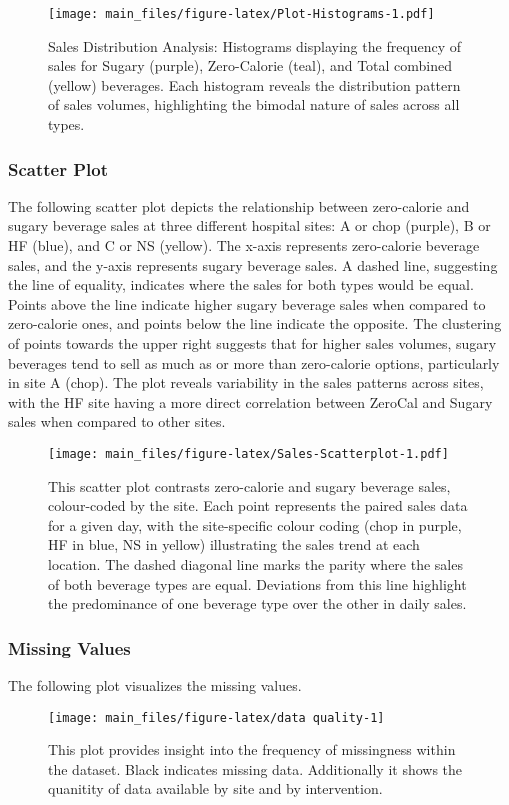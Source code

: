 \documentclass[
]{article}
\begin{document}
\begin{figure}
\centering
\texttt{[image: main\_files/figure-latex/Plot-Histograms-1.pdf]}
\caption{Sales Distribution Analysis: Histograms displaying the
frequency of sales for Sugary (purple), Zero-Calorie (teal), and Total
combined (yellow) beverages. Each histogram reveals the distribution
pattern of sales volumes, highlighting the bimodal nature of sales
across all types.}
\end{figure}

\hypertarget{scatter-plot}{%
\subsubsection{Scatter Plot}\label{scatter-plot}}

The following scatter plot depicts the relationship between zero-calorie
and sugary beverage sales at three different hospital sites: A or chop
(purple), B or HF (blue), and C or NS (yellow). The x-axis represents
zero-calorie beverage sales, and the y-axis represents sugary beverage
sales. A dashed line, suggesting the line of equality, indicates where
the sales for both types would be equal. Points above the line indicate
higher sugary beverage sales when compared to zero-calorie ones, and
points below the line indicate the opposite. The clustering of points
towards the upper right suggests that for higher sales volumes, sugary
beverages tend to sell as much as or more than zero-calorie options,
particularly in site A (chop). The plot reveals variability in the sales
patterns across sites, with the HF site having a more direct correlation
between ZeroCal and Sugary sales when compared to other sites.

\begin{figure}
\centering
\texttt{[image: main\_files/figure-latex/Sales-Scatterplot-1.pdf]}
\caption{This scatter plot contrasts zero-calorie and sugary beverage
sales, colour-coded by the site. Each point represents the paired sales
data for a given day, with the site-specific colour coding (chop in
purple, HF in blue, NS in yellow) illustrating the sales trend at each
location. The dashed diagonal line marks the parity where the sales of
both beverage types are equal. Deviations from this line highlight the
predominance of one beverage type over the other in daily sales.}
\end{figure}

\hypertarget{missing-values}{%
\subsubsection{Missing Values}\label{missing-values}}

The following plot visualizes the missing values.

\begin{figure}

{\centering \texttt{[image: main\_files/figure-latex/data quality-1]} 

}

\caption{This plot provides insight into the frequency of missingness within the dataset. Black indicates missing data. Additionally it shows the quanitity of data available by site and by intervention.}\label{fig:data quality}
\end{figure}
\end{document}
